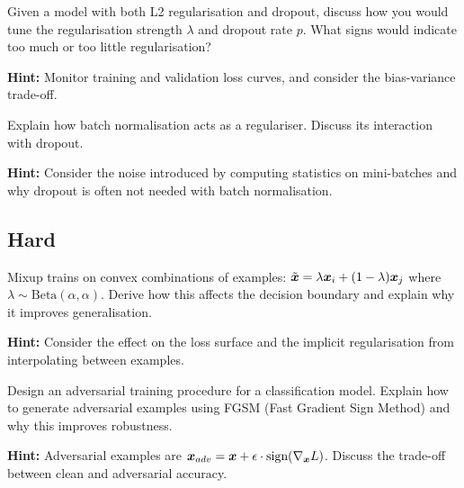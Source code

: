 \begin{problem}
Given a model with both L2 regularisation and dropout, discuss how you would tune the regularisation strength $\lambda$ and dropout rate $p$. What signs would indicate too much or too little regularisation?

\textbf{Hint:} Monitor training and validation loss curves, and consider the bias-variance trade-off.
\end{problem}

\begin{problem}
Explain how batch normalisation acts as a regulariser. Discuss its interaction with dropout.

\textbf{Hint:} Consider the noise introduced by computing statistics on mini-batches and why dropout is often not needed with batch normalisation.
\end{problem}

\subsection*{Hard}

\begin{problem}
Mixup trains on convex combinations of examples: $\tilde{\boldsymbol{x}} = \lambda \boldsymbol{x}_i + (1-\lambda)\boldsymbol{x}_j$ where $\lambda \sim \text{Beta}(\alpha, \alpha)$. Derive how this affects the decision boundary and explain why it improves generalisation.

\textbf{Hint:} Consider the effect on the loss surface and the implicit regularisation from interpolating between examples.
\end{problem}

\begin{problem}
Design an adversarial training procedure for a classification model. Explain how to generate adversarial examples using FGSM (Fast Gradient Sign Method) and why this improves robustness.

\textbf{Hint:} Adversarial examples are $\boldsymbol{x}_{adv} = \boldsymbol{x} + \epsilon \cdot \text{sign}(\nabla_{\boldsymbol{x}} L)$. Discuss the trade-off between clean and adversarial accuracy.
\end{problem}

